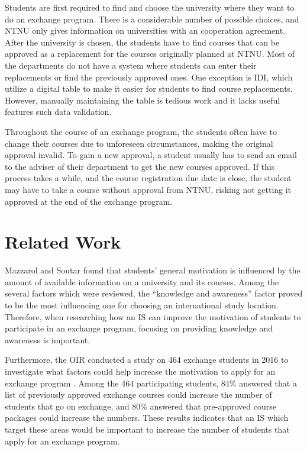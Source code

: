 
Students are first required to find and choose the university where they want to do an exchange program. There is a considerable number of possible choices, and NTNU only gives information on universities with an cooperation agreement. After the university is chosen, the students have to find courses that can be approved as a replacement for the courses originally planned at NTNU. Most of the departments do not have a system where students can enter their replacements or find the previously approved ones. One exception is IDI, which utilize a digital table to make it easier for students to find course replacements. However, manually maintaining the table is tedious work and it lacks useful features such data validation. 

Throughout the course of an exchange program, the students often have to change their courses due to unforeseen circumstances, making the original approval invalid. To gain a new approval, a student usually has to send an email to the adviser of their department to get the new courses approved. If this process takes a while, and the course registration due date is close, the student may have to take a course without approval from NTNU, risking not getting it approved at the end of the exchange program.

\section{Related Work} \label{related_work}

Mazzarol and Soutar \cite{mazzarol2002push} found that students' general motivation is influenced by the amount of available information on a university and its courses. Among the several factors which were reviewed, the \enquote{knowledge and awareness} factor proved to be the most influencing one for choosing an international study location. Therefore, when researching how an IS can improve the motivation of students to participate in an exchange program, focusing on providing knowledge and awareness is important. 

Furthermore, the OIR conducted a study on 464 exchange students in 2016 to investigate what factors could help increase the motivation to apply for an exchange program \cite{intersek_report}. Among the 464 participating students, 84\% answered that a list of previously approved exchange courses could increase the number of students that go on exchange, and 80\% answered that pre-approved course packages could increase the numbers. These results indicates that an IS which target these areas would be important to increase the number of students that apply for an exchange program.

